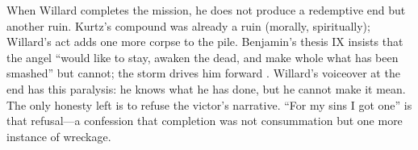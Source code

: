 When Willard completes the mission, he does not produce a redemptive end but another ruin. 
Kurtz's compound was already a ruin (morally, spiritually); Willard's act adds one more corpse 
to the pile. Benjamin's thesis IX insists that the angel ``would like to stay, awaken the dead, 
and make whole what has been smashed'' but cannot; the storm drives him forward 
\parencite{BenjaminTheses1969}. Willard's voiceover at the end has this paralysis: he knows 
what he has done, but he cannot make it mean. The only honesty left is to refuse the victor's 
narrative. ``For my sins I got one'' is that refusal---a confession that completion was not 
consummation but one more instance of wreckage.

